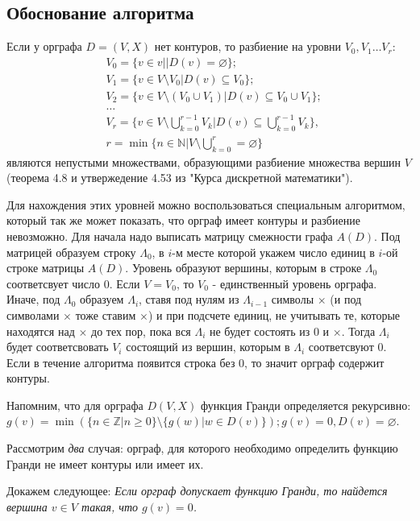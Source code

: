 \documentclass[12pt, letterpaper, titlepage]{article}
\let\emptyset\varnothing
\begin{document}
\subsection{Обоснование алгоритма}

Если у орграфа $D = (V, X)$ нет контуров, то разбиение на уровни $V_0, V_1 \dots V_r:$
\[
    \begin{split}
        &V_0=\{v \in v | |D(v) = \emptyset\};\\
        &V_1 = \{v \in V \setminus V_0| D(v) \subseteq V_0\};\\
        &V_2 = \{v \in V \setminus (V_0 \cup V_1) | D(v) \subseteq V_0 \cup V_1\};\\
        &\dots\\
        &V_r = \{v \in V \setminus \bigcup_{k=0}^{r-1}V_k|D(v)\subseteq\bigcup_{k=0}^{r-1}V_k\},\\
        &r = \min\{n \in \mathbb{N} |V \setminus \bigcup_{k=0}^{r} = \emptyset\}
    \end{split}
\]
являются непустыми множествами, образующими разбиение множества вершин $V$ (теорема 4.8  и утвержедение 4.53 из "Курса дискретной математики").

Для нахождения этих уровней можно воспользоваться специальным алгоритмом, который так же может показать, что орграф имеет контуры и разбиение невозможно.
Для начала надо выписать матрицу смежности графа $A(D)$. Под матрицей образуем строку $\Lambda_0$, в $i$-м месте которой укажем число единиц в $i$-ой строке матрицы $A(D)$.
Уровень образуют вершины, которым в строке $\Lambda_0$ соответсвует число 0. Если $V = V_0$, то $V_0$ - единственный уровень орграфа. Иначе, под $\Lambda_0$ образуем $\Lambda_i$,
ставя под нулям из $\Lambda_{i-1}$ символы $\times$ (и под символами $\times$ тоже ставим $\times$) и при подсчете единиц, не учитывать те, которые находятся над $\times$ до тех пор, пока
вся $\Lambda_i$ не будет состоять из 0 и $\times$. Тогда $\Lambda_i$ будет соответсвовать $V_i$ состоящий из вершин, которым в $\Lambda_i$ соответсвуют 0. Если в течение алгоритма появится строка без 0,
то значит орграф содержит контуры.
 
Напомним, что для орграфа $D(V,X)$ функция Гранди определяется рекурсивно: $g(v) = \min(\{ n \in \mathbb{Z} | n \geq 0\} \setminus \{g(w) | w \in D(v)\}); g(v)=0, D(v) = \emptyset$.

Рассмотрим \emph{два} случая: орграф, для которого необходимо определить функцию Гранди не имеет контуры или имеет их.

Докажем следующее: \emph{Если орграф допускает функцию Гранди, то найдется вершина $v \in V$ такая, что $g(v)=0$.}
\end{document}
